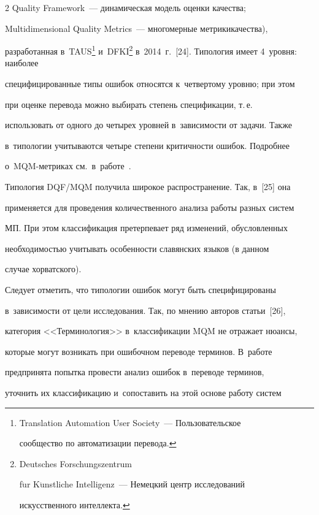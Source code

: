 \begin{multicols}{2}
Quality Framework~--- динамическая модель оценки качества; 


Multidimensional Quality Metrics~--- многомерные метрики\linebreak \mbox{качества}), 


разработанная в~TAUS\footnote{Translation Automation User Society~--- Пользовательское 


сообщество по автоматизации перевода.} и~DFKI\footnote{Deutsches Forschungszentrum 


f$\ddot{\mbox{u}}$r K$\ddot{\mbox{u}}$nstliche Intelligenz~--- Немецкий центр исследований 


искусственного интеллекта.} в~2014~г.~[24]. Типология имеет 4~уровня: наиболее 


специфицированные типы ошибок относятся к~четвертому уровню; при этом 


при оценке перевода можно выбирать степень спецификации, т.\,е.\ 


использовать от одного до четырех уровней в~зависимости от задачи. Также 


в~типологии учитываются четыре степени критичности ошибок. Подробнее 


о~MQM-метриках см.\ в~работе~\cite{7-nur}.


  


  Типология DQF/MQM получила широкое распространение. Так, в~[25] она 


применяется для проведения количественного анализа работы разных систем 


МП. При этом классификация претерпевает ряд изменений, обусловленных 


необходимостью учитывать особенности славянских языков (в данном 


случае хорватского).


  


  Следует отметить, что типологии ошибок могут быть специфицированы 


в~зависимости от цели исследования. Так, по мнению авторов статьи~[26], 


категория <<Терминология>> в~классификации MQM не отражает нюансы, 


которые могут возникать при ошибочном переводе терминов. В~работе 


предпринята попытка провести анализ ошибок в~переводе терминов, 


уточнить их классификацию и~сопоставить на этой основе работу систем 



\end{multicols}
